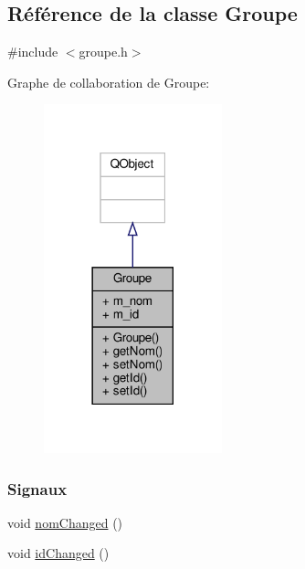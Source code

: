 \hypertarget{class_groupe}{}\subsection{Référence de la classe Groupe}
\label{class_groupe}


{\ttfamily \#include $<$groupe.\+h$>$}



Graphe de collaboration de Groupe\+:\nopagebreak
\begin{figure}[H]
\begin{center}
\leavevmode
\includegraphics[width=146pt]{class_groupe__coll__graph}
\end{center}
\end{figure}
\subsubsection*{Signaux}
\begin{DoxyCompactItemize}
\item 
void \hyperlink{class_groupe_aa4c95ee9ca6f073e7b9e75dbd0e41b61}{nom\+Changed} ()
\item 
void \hyperlink{class_groupe_a8d2126449b6ea1be95bd6b34bf0b28f4}{id\+Changed} ()
\end{DoxyCompactItemize}

